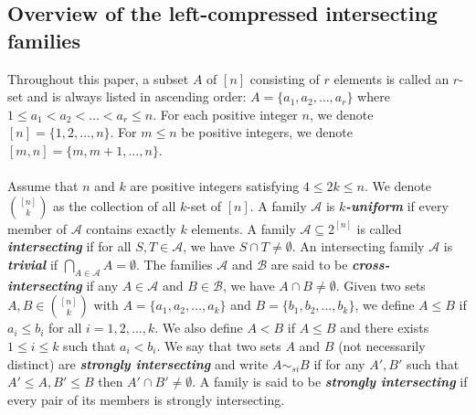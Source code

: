 \documentclass[reqno,english]{amsart}
\theoremstyle{plain}
\theoremstyle{remark}
\newcommand{\0}[0]{\emptyset}
\renewcommand{\1}[0]{\textbf{1}}
\theoremstyle{plain}
\theoremstyle{remark}
\renewcommand{\1}[0]{\textbf{1}}
\begin{document}
\subsection{Overview of the left-compressed intersecting families}
Throughout this paper, a subset $A$ of $[n]$ consisting of $r$ elements is called an $r$-set and is always listed in ascending order: $A=\{a_{1},a_{2},\ldots,a_{r}\}$ where $1\leq a_{1}< a_{2}<\ldots<a_{r} \leq n$. For each positive integer $n$, we denote $[n]=\{1,2,\ldots,n\}$. For $m \leq n$ be positive integers, we denote $[m,n]= \{m,m+1,\ldots,n\}$. \\ \\
Assume that $n$ and $k$ are positive integers satisfying $4 \leq 2k \leq n$. We denote $\binom{[n]}{k}$ as the collection of all $k$-set of $[n]$. A family $\mathcal{A}$ is {\bf \emph{$k$-uniform}} if every member of $\mathcal{A}$ contains exactly $k$ elements. A family $\mathcal{A} \subseteq 2^{[n]}$ is called {\bf \emph{ intersecting }} if for all $S,T \in \mathcal{A}$, we have $S \cap T \neq \emptyset$. An intersecting family $\mathcal{A}$ is {\bf \emph{ trivial }} if $\bigcap_{A \in \mathcal{A}}A=\emptyset$. The families $\mathcal{A}$ and $ \mathcal{B}$ are said to be {\bf \emph{cross- intersecting }} if any $A \in \mathcal{A}$ and $B \in \mathcal{B}$, we have $A \cap B \neq \emptyset$. Given two sets $A,B \in \binom{[n]}{k}$ with $A=\{a_{1},a_{2},\ldots,a_{k} \}$ and $B=\{b_{1},b_{2},\ldots,b_{k}\}$, we define $A \leq B$ if $a_{i} \leq b_{i}$ for all $i=1,2,\ldots,k$. We also define $A < B$ if $A \leq B$ and there exists $1 \leq i \leq k$ such that $a_{i} < b_{i}$. We say that two sets $A$ and $B$ (not necessarily distinct) are {\bf \emph{ strongly intersecting }} and write $A \sim_{si} B$ if for any $A',B'$ such that $A'\leq A, B'\leq B$ then $A' \cap B' \neq \emptyset$. A family is said to be {\bf\emph{ strongly intersecting}} if every pair of its members is strongly intersecting.\\
\end{document}
